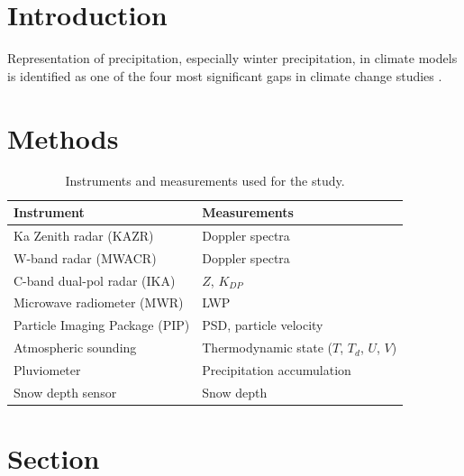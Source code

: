 \documentclass[portrait,a0]{a0poster}
\begin{document}
\vfill %

\begin{multicols}{3} %

\section{Introduction}

Representation of precipitation, especially winter precipitation, in climate models is identified as one of the four most significant gaps in climate change studies \citep{schiermeier2010real}.

\lipsum[1]

\section{Methods}

\lipsum[2]

\begin{table}[H]
\centering
\begin{tabular}{ll}
\toprule
Instrument						& Measurements \\
\midrule
Ka Zenith radar (KAZR)			& Doppler spectra			\\
W-band radar (MWACR)				& Doppler spectra			\\
C-band dual-pol radar (IKA)		& $Z$, $K_{DP}$				\\
Microwave radiometer (MWR)		& LWP						\\
Particle Imaging Package (PIP)	& PSD, particle velocity		\\
Atmospheric sounding				& Thermodynamic state ($T$, $T_d$, $U$, $V$) \\
Pluviometer						& Precipitation accumulation	\\
Snow depth sensor				& Snow depth 				\\
\bottomrule
\end{tabular}
\caption{Instruments and measurements used for the study.}
\label{tab:instruments}
\end{table}

\section{Section}

\lipsum[3]


\end{multicols}
\end{document}
